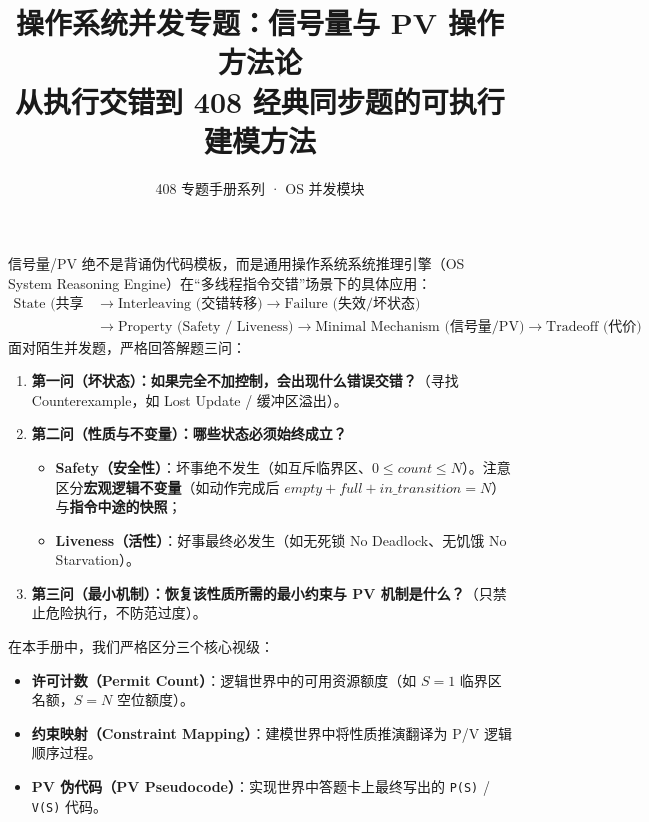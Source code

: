 \documentclass[11pt,a4paper]{ctexart}
\title{\vspace{-1.2cm}\textbf{操作系统并发专题：信号量与 PV 操作方法论}\\[0.45em]
\large 从执行交错到 408 经典同步题的可执行建模方法}
\author{408 专题手册系列 · OS 并发模块}
\date{}
\newcommand{\kw}[1]{\textbf{#1}}
\newcommand{\code}[1]{\texttt{#1}}
\begin{document}
\maketitle

\begin{corebox}
信号量/PV 绝不是背诵伪代码模板，而是通用操作系统系统推理引擎（OS System Reasoning Engine）在“多线程指令交错”场景下的具体应用：
\[
\boxed{
\begin{aligned}
\text{State (共享状态)}
&\to\text{Interleaving (交错转移)}
\to\text{Failure (失效/坏状态)}\\
&\to\text{Property (Safety / Liveness)}
\to\text{Minimal Mechanism (信号量/PV)}
\to\text{Tradeoff (代价)}
\end{aligned}
}
\]
面对陌生并发题，严格回答解题三问：
\begin{enumerate}[leftmargin=1.5em]
\item \kw{第一问（坏状态）：如果完全不加控制，会出现什么错误交错？}（寻找 Counterexample，如 Lost Update / 缓冲区溢出）。
\item \kw{第二问（性质与不变量）：哪些状态必须始终成立？}
  \begin{itemize}
    \item \kw{Safety（安全性）}：坏事绝不发生（如互斥临界区、$0\le count\le N$）。注意区分\kw{宏观逻辑不变量}（如动作完成后 $empty+full+in\_transition=N$）与\kw{指令中途的快照}；
    \item \kw{Liveness（活性）}：好事最终必发生（如无死锁 No Deadlock、无饥饿 No Starvation）。
  \end{itemize}
\item \kw{第三问（最小机制）：恢复该性质所需的最小约束与 PV 机制是什么？}（只禁止危险执行，不防范过度）。
\end{enumerate}

在本手册中，我们严格区分三个核心视级：
\begin{itemize}[leftmargin=1.5em]
\item \kw{许可计数（Permit Count）}：逻辑世界中的可用资源额度（如 $S=1$ 临界区名额，$S=N$ 空位额度）。
\item \kw{约束映射（Constraint Mapping）}：建模世界中将性质推演翻译为 P/V 逻辑顺序过程。
\item \kw{PV 伪代码（PV Pseudocode）}：实现世界中答题卡上最终写出的 \code{P(S)} / \code{V(S)} 代码。
\end{itemize}
\end{corebox}
\end{document}
